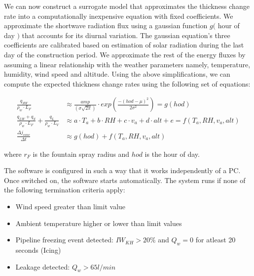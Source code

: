 \documentclass[tc, manuscript]{copernicus}
\begin{document}
We can now construct a surrogate model that approximates the thickness change rate into a computationally
inexpensive equation with fixed coefficients. We approximate the shortwave radiation flux using a gaussian
function $g($ hour of day $)$ that accounts for its diurnal variation. The gaussian equation's three
coefficients are calibrated based on estimation of solar radiation during the last day of the construction
period. We approximate the rest of the energy fluxes by assuming a linear relationship with the weather
parameters namely, temperature, humidity, wind speed and altitude. Using the above simplifications, we can
compute the expected thickness change rates using the following set of equations:

\begin{subequations}
	\begin{align}
		\label{eqn:sun}
  \frac{q_{SW}}{\rho_w \cdot L_F} & \approx \frac{amp}{(\sigma \sqrt{2\pi})} \cdot
  exp\left(\frac{-(hod-\mu)^2}{2\sigma^2}\right) = g(hod)  \\
		\label{eqn:T}
   \frac{q_{LW} + q_{S}}{\rho_w \cdot L_F} + \frac{q_L}{\rho_w \cdot L_V} & \approx a \cdot T_a + b \cdot RH + c \cdot v_a +
  d \cdot alt + e = f(T_a, RH, v_a, alt) \\
		\label{eqn:auto}
  \frac{\Delta j_{cone}}{\Delta t} & \approx g(hod) + f(T_a, RH, v_a, alt)
	\end{align}
\end{subequations}

where $r_F$ is the fountain spray radius and $hod$ is the hour of day.


The software is configured in such a way that it works independently of a PC. Once switched on, the software
starts automatically. The system runs if none of the following termination criteria apply:

\begin{itemize}
\item Wind speed greater than limit value
\item Ambient temperature higher or lower than limit values
\item Pipeline freezing event detected: $IW_{KH} > 20 \%$ and $Q_w = 0$ for atleast 20 seconds (Icing)
\item Leakage detected: $Q_w > 65 l/min$
\end{itemize}
\end{document}

